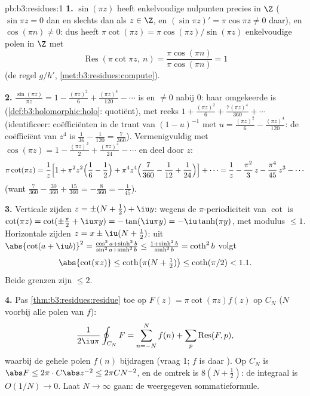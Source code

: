 \begin{solution}{pb:b3:residues:1}
\textbf{1.} $\sin(\pi z)$ heeft enkelvoudige nulpunten precies in
$\Z$ ($\sin\pi z = 0$ dan en slechts dan als $z \in \Z$, en
$(\sin\pi z)' = \pi\cos\pi z \neq 0$ daar), en $\cos(\pi n) \neq
0$: dus heeft $\pi\cot(\pi z) = \pi\cos(\pi z)/\sin(\pi z)$
enkelvoudige polen in $\Z$ met
\[
\operatorname{Res}(\pi\cot\pi z,\ n)
= \frac{\pi\cos(\pi n)}{\pi\cos(\pi n)} = 1
\]
(de regel $g/h'$, \cref{met:b3:residues:compute}).

\textbf{2.} $\frac{\sin(\pi z)}{\pi z} = 1 - \frac{(\pi z)^2}6 +
\frac{(\pi z)^4}{120} - \cdots$ is  en $\neq 0$ nabij
$0$: haar omgekeerde is 
(\cref{def:b3:holomorphic:holo}: quotiënt), met reeks $1 +
\frac{(\pi z)^2}{6} + \frac{7(\pi z)^4}{360} + \cdots$
(identificeer: coëfficiënten in de trant van $(1 - u)^{-1}$ met
$u = \frac{(\pi z)^2}6 - \frac{(\pi z)^4}{120}$: de coëfficiënt
van $z^4$ is $\frac1{36} - \frac1{120} = \frac{7}{360}$).
Vermenigvuldig met $\cos(\pi z) = 1 - \frac{(\pi z)^2}2 +
\frac{(\pi z)^4}{24} - \cdots$ en deel door $z$:
\[
\pi\cot(\pi z) = \frac1z\Bigl[1 + \pi^2z^2\Bigl(\frac16 -
\frac12\Bigr) + \pi^4z^4\Bigl(\frac7{360} - \frac1{12} +
\frac1{24}\Bigr)\Bigr] + \cdots
= \frac1z - \frac{\pi^2}3\,z - \frac{\pi^4}{45}\,z^3 -
\cdots
\]
(want $\frac7{360} - \frac{30}{360} + \frac{15}{360} =
-\frac8{360} = -\frac1{45}$).

\textbf{3.} Verticale zijden $z = \pm(N + \frac12) + \iu y$:
wegens de $\pi$-periodiciteit van $\cot$ is $\cot(\pi z) =
\cot(\pm\frac\pi2 + \iu\pi y) = -\tan(\iu\pi y) =
-\iu\tanh(\pi y)$, met modulus $\leq 1$. Horizontale zijden $z =
x \pm \iu(N + \frac12)$: uit $\abs{\cot(a + \iu b)}^2 =
\frac{\cos^2a + \sinh^2b}{\sin^2a + \sinh^2b} \leq \frac{1 +
\sinh^2b}{\sinh^2b} = \coth^2 b$ volgt
\[
\abs{\cot(\pi z)} \leq \coth\bigl(\pi(N + \tfrac12)\bigr)
\leq \coth(\pi/2) < 1.1 .
\]
Beide grenzen zijn $\leq 2$.

\textbf{4.} Pas \cref{thm:b3:residues:residue} toe op $F(z) =
\pi\cot(\pi z)f(z)$ op $C_N$ ($N$ voorbij alle polen van $f$):
\[
\frac1{2\iu\pi}\oint_{C_N}F = \sum_{n=-N}^{N}f(n) +
\sum_p\operatorname{Res}(F, p),
\]
waarbij de gehele polen $f(n)$ bijdragen (vraag 1; $f$ is daar
). Op $C_N$ is $\abs F \leq 2\pi\cdot C\abs z^{-2} \leq
2\pi C N^{-2}$, en de omtrek is $8(N + \frac12)$: de integraal is
$O(1/N) \to 0$. Laat $N \to \infty$ gaan: de weergegeven
sommatieformule.


\end{solution}
